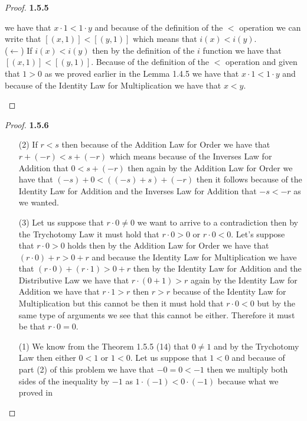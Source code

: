 \documentclass[11pt]{article}
\theoremstyle{definition}
\begin{document}
\begin{proof}{\textbf{1.5.5}}
\begin{itemize}
\begin{itemize}
            we have that $x\cdot 1<1\cdot y$ and because of the definition of the $<$
            operation we can write that $[(x,1)]<[(y,1)]$ which means that $i(x)<i(y)$.\\
            ($\leftarrow$) If $i(x)<i(y)$ then by the definition of the $i$ function we
            have that $[(x,1)]<[(y,1)]$. Because of the definition of the $<$ operation 
            and given that $1>0$ as we proved earlier in the Lemma 1.4.5 we have that
            $x\cdot 1<1\cdot y$ and because of the Identity Law for Multiplication we
            have that $x<y$.
        \end{itemize}
    \end{itemize}
    \end{proof}
    \begin{proof}{\textbf{1.5.6}}
    \begin{itemize}
        \item [(2)]
        If $r<s$ then because of the Addition Law for Order we have that $r+(-r)<s+(-r)$
        which means because of the Inverses Law for Addition that $0<s+(-r)$ then again
        by the Addition Law for Order we have that $(-s)+0<((-s)+s)+(-r)$ then it follows
        because of the Identity Law for Addition and the Inverses Law for Addition that
        $-s<-r$ as we wanted.
        \item [(3)]
        Let us suppose that $r\cdot 0 \neq 0$ we want to arrive to a contradiction 
        then by the Trychotomy Law it must hold
        that $r \cdot 0 > 0$ or $r \cdot 0 < 0$. Let's suppose that $r \cdot 0 > 0$
        holds then by the Addition Law for Order we have that $(r \cdot 0) + r > 0 + r$
        and because the Identity Law for Multiplication we have that  
        $(r \cdot 0) + (r \cdot 1) > 0 + r$ then by the Identity Law for Addition and
        the Distributive Law we have that $r \cdot (0 + 1) > r$ again by the Identity
        Law for Addition we have that $r \cdot 1 > r$ then $r > r$ because of the
        Identity Law for Multiplication but this cannot be then it must hold that
        $r \cdot 0 < 0$ but by the same type of arguments we see that this cannot be
        either. Therefore it must be that $r \cdot 0 = 0$.
\cleardoublepage
        \item [(1)]
        We know from the Theorem 1.5.5 (14) that $0\neq 1$ and by the Trychotomy Law
        then either $0<1$ or $1<0$. Let us suppose that $1<0$ and because of part (2)
        of this problem we have that $-0=0<-1$ then we multiply both sides of the 
        inequality by $-1$ as $1\cdot (-1) < 0\cdot(-1)$ because what we proved in

\end{itemize}
\end{proof}
\end{document}
